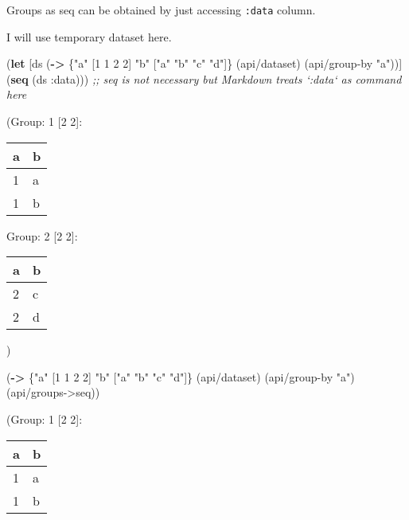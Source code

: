\documentclass[]{article}
\newenvironment{Shaded}{\begin{snugshade}}{\end{snugshade}}
\newcommand{\AttributeTok}[1]{\textcolor[rgb]{0.77,0.63,0.00}{#1}}
\newcommand{\CommentTok}[1]{\textcolor[rgb]{0.56,0.35,0.01}{\textit{#1}}}
\newcommand{\DecValTok}[1]{\textcolor[rgb]{0.00,0.00,0.81}{#1}}
\newcommand{\KeywordTok}[1]{\textcolor[rgb]{0.13,0.29,0.53}{\textbf{#1}}}
\newcommand{\NormalTok}[1]{#1}
\newcommand{\StringTok}[1]{\textcolor[rgb]{0.31,0.60,0.02}{#1}}
\begin{document}
Groups as seq can be obtained by just accessing \texttt{:data} column.

I will use temporary dataset here.

\begin{Shaded}
\begin{Highlighting}[]
\NormalTok{(}\KeywordTok{let}\NormalTok{ [ds (}\KeywordTok{->}\NormalTok{ \{}\StringTok{"a"}\NormalTok{ [}\DecValTok{1} \DecValTok{1} \DecValTok{2} \DecValTok{2}\NormalTok{]}
              \StringTok{"b"}\NormalTok{ [}\StringTok{"a"} \StringTok{"b"} \StringTok{"c"} \StringTok{"d"}\NormalTok{]\}}
\NormalTok{             (api/dataset)}
\NormalTok{             (api/group-by }\StringTok{"a"}\NormalTok{))]}
\NormalTok{  (}\KeywordTok{seq}\NormalTok{ (ds }\AttributeTok{:data}\NormalTok{))) }\CommentTok{;; seq is not necessary but Markdown treats `:data` as command here}
\end{Highlighting}
\end{Shaded}

(Group: 1 {[}2 2{]}:

\begin{longtable}[]{@{}ll@{}}
\toprule
a & b\tabularnewline
\midrule
\endhead
1 & a\tabularnewline
1 & b\tabularnewline
\bottomrule
\end{longtable}

Group: 2 {[}2 2{]}:

\begin{longtable}[]{@{}ll@{}}
\toprule
a & b\tabularnewline
\midrule
\endhead
2 & c\tabularnewline
2 & d\tabularnewline
\bottomrule
\end{longtable}

)

\begin{Shaded}
\begin{Highlighting}[]
\NormalTok{(}\KeywordTok{->}\NormalTok{ \{}\StringTok{"a"}\NormalTok{ [}\DecValTok{1} \DecValTok{1} \DecValTok{2} \DecValTok{2}\NormalTok{]}
     \StringTok{"b"}\NormalTok{ [}\StringTok{"a"} \StringTok{"b"} \StringTok{"c"} \StringTok{"d"}\NormalTok{]\}}
\NormalTok{    (api/dataset)}
\NormalTok{    (api/group-by }\StringTok{"a"}\NormalTok{)}
\NormalTok{    (api/groups->seq))}
\end{Highlighting}
\end{Shaded}

(Group: 1 {[}2 2{]}:

\begin{longtable}[]{@{}ll@{}}
\toprule
a & b\tabularnewline
\midrule
\endhead
1 & a\tabularnewline
1 & b\tabularnewline
\bottomrule
\end{longtable}
\end{document}
